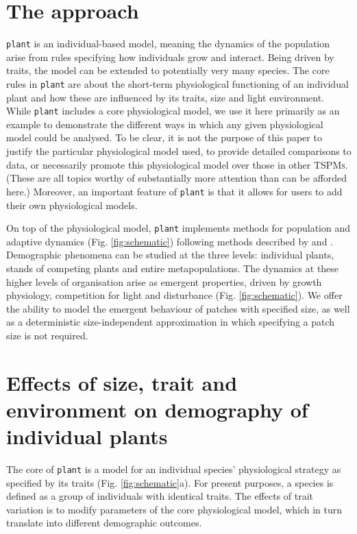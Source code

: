 \documentclass[a4paper,11pt]{article}
\newcommand{\plant}{\texttt{plant}}
\begin{document}
\section{The approach}

{\plant} is an individual-based model, meaning the dynamics of the
population arise from rules specifying how individuals grow and interact. 
Being driven by traits, the model can be extended to potentially very many species. The
core rules in {\plant} are about the short-term physiological
functioning of an individual plant and how these are influenced by its
traits, size and light environment.  While {\plant}
includes a core physiological model, we use it here primarily as an example to
demonstrate the different ways in which any given physiological model
could be analysed. To be clear, it is not the purpose
of this paper to justify the particular physiological model used, to provide detailed
comparisons to data, or necessarily promote this physiological model over
those in other \textsc{TSPMs}. (These are all topics worthy of
substantially more attention than can be afforded here.) Moreover, an important
feature of {\plant} is that it allows for users to add their own
physiological models.

On top of the physiological model, {\plant} implements methods for
population and adaptive dynamics (Fig.  \ref{fig:schematic}) following methods
described by \citet{Falster-2011} and \citet{Falster-2015}. Demographic
phenomena can be studied at the three levels: individual plants, stands of
competing plants and entire metapopulations. The dynamics at these higher
levels of organisation arise as emergent properties, driven by growth
physiology, competition for light and disturbance (Fig.  \ref{fig:schematic}).
We offer the ability to model the emergent behaviour of patches with
specified size, as well as a deterministic size-independent approximation
in which specifying a patch size is not required.

\section{Effects of size, trait and environment on demography of individual plants}

The core of {\plant} is a model for an individual species' physiological
strategy as specified by its traits (Fig. \ref{fig:schematic}a). For
present purposes, a species is defined as a group of individuals with identical
traits. The effects of trait variation is to modify parameters of the core
physiological model, which in turn translate into different demographic outcomes.
\end{document}
